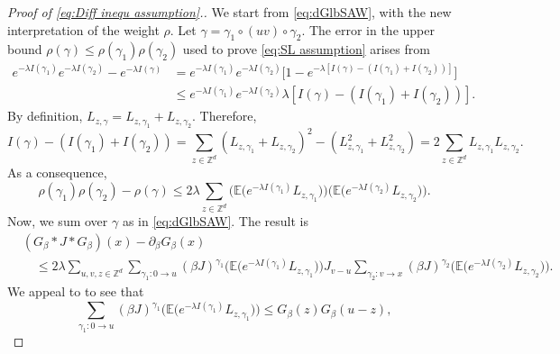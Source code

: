 \documentclass[11pt,a4paper]{article}
\numberwithin{equation}{section}
\theoremstyle{plain}
\theoremstyle{definition}
\newcommand\1{\mathds{1}}
\begin{document}
\begin{proof}[Proof of \eqref{eq:Diff inequ assumption}.]
We start from \eqref{eq:dGlbSAW}, with the new interpretation of the weight $\rho$. Let $\gamma = \gamma_1 \circ (uv) \circ \gamma_2$.
The error in the upper bound $\rho(\gamma) \leq \rho(\gamma_1) \rho(\gamma_2)$
used to prove \eqref{eq:SL assumption} arises from
\begin{align}
    e^{-\lambda I(\gamma_1)}e^{-\lambda I(\gamma_2)} -
    e^{-\lambda I(\gamma)}
    & =
    e^{-\lambda I(\gamma_1)}e^{-\lambda I(\gamma_2)}
    \Big[1-e^{ -\lambda [I(\gamma)-(I(\gamma_1)+I(\gamma_2))] } \Big]
    \nonumber \\ & \le
    e^{-\lambda I(\gamma_1)}e^{-\lambda I(\gamma_2)}
     \lambda [I(\gamma)-(I(\gamma_1)+I(\gamma_2))]   .
\end{align}
By definition, $L_{z,\gamma} = L_{z,\gamma_1}+L_{z,\gamma_2}$. Therefore,
\begin{equation}
    I(\gamma)-(I(\gamma_1)+I(\gamma_2)) = \sum_{z \in \mathbb Z^d} (L_{z,\gamma_1}+L_{z,\gamma_2})^2-\left(L_{z,\gamma_1}^2+L_{z,\gamma_2}^2\right) =  2 \sum_{z\in \mathbb Z^d} L_{z,\gamma_1}L_{z,\gamma_2} .
\end{equation}
As a consequence,
\begin{equation}
    \rho(\gamma_1) \rho(\gamma_2) - \rho(\gamma)
    \le
    2\lambda\sum_{z\in \mathbb Z^d}
    \Big( \mathbb E \big(e^{-\lambda I(\gamma_1)} L_{z,\gamma_1}\big) \Big)
    \Big( \mathbb E \big(e^{-\lambda I(\gamma_2)} L_{z,\gamma_2}\big) \Big).
\end{equation}
Now, we sum over $\gamma$ as in \eqref{eq:dGlbSAW}.  The result is
\begin{align}
    &(G_\beta * J * G_\beta)(x) - \partial_\beta G_\beta(x)
    \nonumber \\ & \quad \le
    2\lambda     \sum_{u,v,z\in \mathbb{Z}^d}
    \sum_{\gamma_1 : 0 \rightarrow u}
    (\beta J)^{\gamma_1}
    \Big( \mathbb E \big(e^{-\lambda I(\gamma_1)} L_{z,\gamma_1}\big) \Big)
    J_{v-u}
    \sum_{\gamma_2 : v \rightarrow x}
    (\beta J)^{\gamma_2}
    \Big( \mathbb E \big(e^{-\lambda I(\gamma_2)} L_{z,\gamma_2}\big) \Big).
\end{align}
We appeal to \cite[Lemma~2.1]{BFS82} to see that
\begin{equation}
    \sum_{\gamma_1 : 0 \rightarrow u}
    (\beta J)^{\gamma_1}
    \Big( \mathbb E \big(e^{-\lambda I(\gamma_1)} L_{z,\gamma_1}\big) \Big)
        \le
    G_\beta(z) G_\beta(u-z),
\end{equation}

\end{proof}
\end{document}
